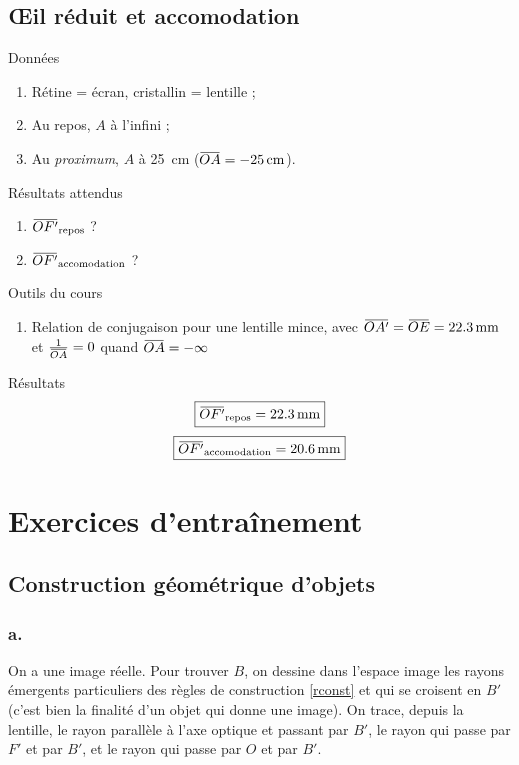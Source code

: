 \documentclass[10pt,a5paper,notitlepage]{book}
\begin{document}
\subsection{Œil réduit et accomodation}
\begin{vtcb}{Données}
    \begin{enumerate}
        \item Rétine = écran, cristallin = lentille ;
        \item Au repos, $A$ à l'infini ;
        \item Au \textit{proximum}, $A$ à \SI{25}{cm} ($\OA = \SI{-25}{cm}$).
    \end{enumerate}
\end{vtcb}

\begin{rtcb}{Résultats attendus}
    \begin{enumerate}
        \item $\OF \St{repos}$ ?
        \item $\OF \St{accomodation}$ ?
    \end{enumerate}
\end{rtcb}

\begin{btcb}{Outils du cours}
   \begin{enumerate}
       \item Relation de conjugaison pour une lentille mince, avec $\OAp =
           \obar{OE} = \SI{22.3}{mm} $ et $\frac{1}{\OA} = 0$ quand $\OA =
           -\infty$
   \end{enumerate} 
\end{btcb}

\begin{lgtcb}{Résultats}
    \[ \boxed{\OF\St{repos} = \SI{22.3}{mm}}\]
    \[ \boxed{\OF\St{accomodation} = \SI{20.6}{mm}} \]
\end{lgtcb}

\section{Exercices d'entraînement}
\setcounter{subsection}{4}
\subsection{Construction géométrique d'objets}
\subsubsection{a.}
On a une image réelle. Pour trouver $B$, on dessine dans l'espace image les
rayons émergents particuliers des règles de construction \ref{rconst} et qui se
croisent en $B'$ (c'est bien la finalité d'un objet qui donne une image). On
trace, depuis la lentille, le rayon parallèle à l'axe optique et passant par
$B'$, le rayon qui passe par $F'$ et par $B'$, et le rayon qui passe par $O$ et
par $B'$. \bigbreak
\end{document}
